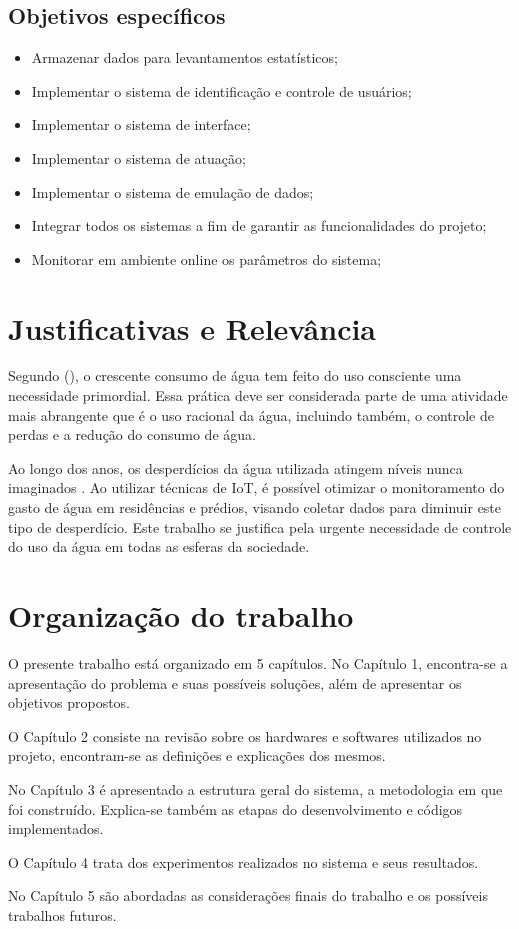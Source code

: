 \subsection{Objetivos específicos}

\begin{itemize}
	\item Armazenar dados para levantamentos estatísticos;
	\item Implementar o sistema de identificação e controle de usuários;
	\item Implementar o sistema de interface;
	\item Implementar o sistema de atuação;
	\item Implementar o sistema de emulação de dados;
	\item Integrar todos os sistemas a fim de garantir as funcionalidades do projeto;
	\item Monitorar em ambiente online os parâmetros do sistema;
\end{itemize}

\section{Justificativas e Relev{\^a}ncia}
%
Segundo \citeauthor{AlvesDaSilva} (\citeyear{AlvesDaSilva}), o crescente consumo de água
tem feito do uso consciente uma necessidade primordial. Essa prática deve ser considerada parte de uma atividade mais abrangente que é o uso racional da água, incluindo também, o controle de perdas e a redução do consumo de água.

Ao longo dos anos, os desperdícios da água utilizada atingem níveis nunca imaginados \cite{rebouccas2003agua}. Ao utilizar técnicas de IoT, é possível otimizar o monitoramento do gasto de água em residências e prédios, visando coletar dados para diminuir este tipo de desperdício. Este trabalho se justifica pela urgente necessidade de controle do uso da água em todas as esferas da sociedade. 
%
\section{Organização do trabalho}

O presente trabalho está organizado em 5 capítulos. No Capítulo 1, encontra-se a apresentação do problema e suas possíveis soluções, além de apresentar os objetivos propostos.

O Capítulo 2 consiste na revisão sobre os hardwares e softwares utilizados no projeto, encontram-se as definições e explicações dos mesmos.

No Capítulo 3 é apresentado a estrutura geral do sistema, a metodologia em que foi construído. Explica-se também as etapas do desenvolvimento e códigos implementados.

O Capítulo 4 trata dos experimentos realizados no sistema e seus resultados.

No Capítulo 5 são abordadas as considerações finais do trabalho e os possíveis trabalhos futuros.